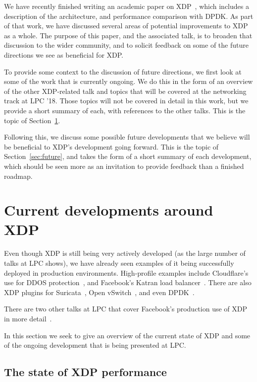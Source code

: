 \documentclass[sigconf]{acmart}
\begin{document}
We have recently finished writing an academic paper on XDP~\cite{xdp-paper},
which includes a description of the architecture, and performance comparison
with DPDK. As part of that work, we have discussed several areas of potential
improvements to XDP as a whole. The purpose of this paper, and the associated
talk, is to broaden that discussion to the wider community, and to solicit
feedback on some of the future directions we see as beneficial for XDP.

To provide some context to the discussion of future directions, we first look at
some of the work that is currently ongoing. We do this in the form of an
overview of the other XDP-related talk and topics that will be covered at the
networking track at LPC '18. Those topics will not be covered in detail in this
work, but we provide a short summary of each, with references to the other
talks. This is the topic of Section~\ref{sec:current}.

Following this, we discuss some possible future developments that we believe
will be beneficial to XDP's development going forward. This is the topic of
Section~\ref{sec:future}, and takes the form of a short summary of each
development, which should be seen more as an invitation to provide feedback than
a finished roadmap.

\section{Current developments around XDP}
\label{sec:current}

Even though XDP is still being very actively developed (as the large number of
talks at LPC shows), we have already seen examples of it being successfully
deployed in production environments. High-profile examples include Cloudflare's
use for DDOS protection~\cite{cloudflare-ddos}, and Facebook's Katran load
balancer~\cite{katran}. There are also XDP plugins for Suricata~\cite{suricata},
Open vSwitch~\cite{ovs-xdp}, and even DPDK~\cite{dpdk-xdp}.

There are two other talks at LPC that cover Facebook's production use of XDP in
more detail~\cite{facebook-lessons,facebook-firewall}.

In this section we seek to give an overview of the current state of XDP and some
of the ongoing development that is being presented at LPC.

\subsection{The state of XDP performance}
\label{sec:state-xdp-perf}
\end{document}
